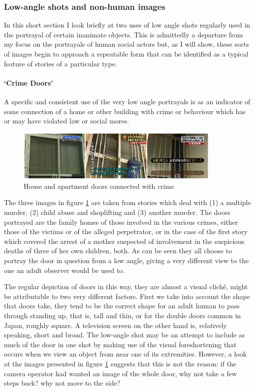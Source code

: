 \subsubsection{Low-angle shots and non-human images}\label{subsubsec:nonhum}

In this short section I look briefly at two uses of low angle shots regularly used in the portrayal of certain inanimate objects. This is admittedly a departure from my focus on the portrayals of human social actors but, as I will show, these sorts of images begin to approach a repeatable form that can be identified as a typical feature of stories of a particular type. 

\paragraph{`Crime Doors'}
A specific and consistent use of the very low angle portrayals is as an indicator of some connection of a home or other building with crime or behaviour which has or may have violated law or social mores.

\begin{figure}[t]
\centering
\includegraphics[height=2.5cm]{crimedoors.jpg} 
\caption{House and apartment doors connected with crime}
\label{fig:crimedoors}
\end{figure}

The three images in figure \ref{fig:crimedoors} are taken from stories which deal with (1) a multiple murder, (2) child abuse and shoplifting and (3) another murder. The doors portrayed are the family homes of those involved in the various crimes, either those of the victims or of the alleged perpetrator, or in the case of the first story which covered the arrest of a mother suspected of involvement in the suspicious deaths of three of her own children, both. As can be seen they all choose to portray the door in question from a low angle, giving a very different view to the one an adult observer would be used to.

The regular depiction of doors in this way, they are almost a visual clich\'{e}, might be attributable to two very different factors. First we take into account the shape that doors take, they tend to be the correct shape for an adult human to pass through standing up, that is, tall and thin, or for the double doors common in Japan, roughly square. A television screen on the other hand is, relatively speaking, short and broad. The low-angle shot may be an attempt to include as much of the door in one shot by making use of the visual foreshortening that occurs when we view an object from near one of its extremities. However, a look at the images presented in figure \ref{fig:crimedoors} suggests that this is not the reason: if the camera operator had wanted an image of the whole door, why not take a few steps back? why not move to the side?

